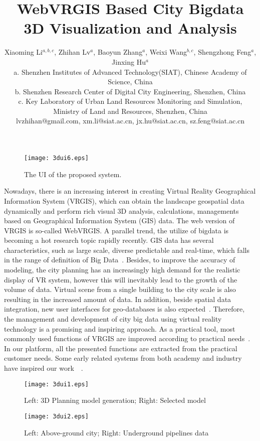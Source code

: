 \documentclass{vgtc}
\title{WebVRGIS Based City Bigdata 3D Visualization and Analysis}
\author{Xiaoming Li$^{a,b,c}$, Zhihan Lv$^{a}$, Baoyun Zhang$^{a}$, Weixi Wang$^{b,c}$, Shengzhong Feng$^{a}$, Jinxing Hu$^{a}$\\
a. Shenzhen Institutes of Advanced Technology(SIAT), Chinese Academy of Science, China\\
b. Shenzhen Research Center of Digital City Engineering, Shenzhen, China\\
c. Key Laboratory of Urban Land Resources Monitoring and Simulation, \\Ministry of Land and Resources, Shenzhen, China\\
lvzhihan@gmail.com, xm.li@siat.ac.cn, jx.hu@siat.ac.cn, sz.feng@siat.ac.cn}
\begin{document}
\maketitle


\begin{figure}
    \begin{center}
    \texttt{[image: 3dui6.eps]}
    \caption{The UI of the proposed system.}
    \label{fig:3dui6}
        \end{center}
\end{figure}





Nowadays, there is an increasing interest in creating Virtual Reality Geographical Information System (VRGIS), which can obtain the landscape
geospatial data dynamically and perform rich visual 3D analysis, calculations, managements based on Geographical Information System (GIS) data. The web version of VRGIS is so-called WebVRGIS. A parallel trend, the utilize of bigdata is becoming a hot research topic rapidly recently. GIS data
has several characteristics, such as large scale, diverse
predictable and real-time, which falls in the range of definition
of Big Data~\cite{bigdata}. Besides, to improve the accuracy of modeling, the city planning has an increasingly high demand for
the realistic display of VR system, however this will inevitably
lead to the growth of the volume of data. Virtual scene from a single building to the city scale is also resulting
in the increased amount of data. In addition, beside spatial data integration, new user interfaces for geo-databases is also expected~\cite{Breunig:2011:RGR:1998664.1998871}.
Therefore, the management and development of city big data using virtual reality technology is a promising and inspiring approach. 
As a practical tool, most commonly used functions of VRGIS are improved according to practical needs~\cite{Lin201374}. In our platform, all the presented functions are extracted from the practical customer needs. Some early related systems from both academy and industry have inspired our work~\cite{Zhang:2007:DDD:1279008.1279148}~\cite{Ma:2010:IVN:1869057.1869058}.

\begin{figure}
    \begin{center}
    \texttt{[image: 3dui1.eps]}
    \caption{Left: 3D Planning model generation; Right: Selected model}
    \label{fig:3dui1}
        \end{center}
\end{figure}
\begin{figure}
    \begin{center}
    \texttt{[image: 3dui2.eps]}
    \caption{Left: Above-ground city; Right: Underground pipelines data}
    \label{fig:3dui2}
        \end{center}
\end{figure}
\end{document}
